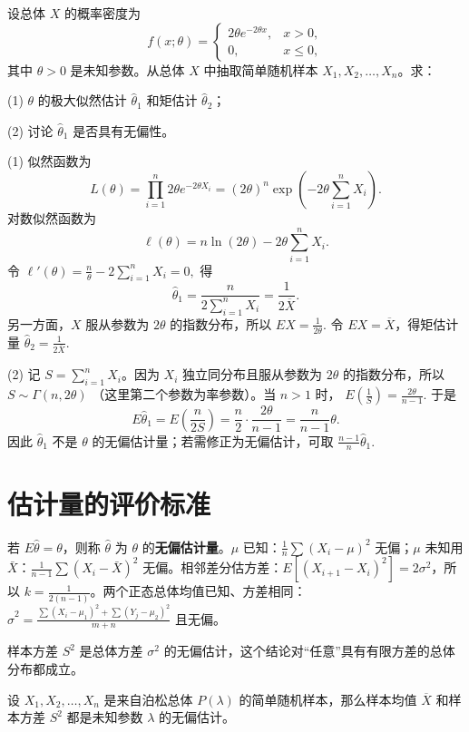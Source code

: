\documentclass[lang=cn,11pt]{elegantbook}
\begin{document}
\begin{exercise}\label{exer:src-2011-ab-b-08-34credit}
设总体 \(X\) 的概率密度为
\[
f(x;\theta)=
\begin{cases}
2\theta e^{-2\theta x}, & x>0,\\
0, & x\le0,
\end{cases}
\]
其中 \(\theta>0\) 是未知参数。从总体 \(X\) 中抽取简单随机样本
\(X_1,X_2,\dots,X_n\)。求：\par
(1) \(\theta\) 的极大似然估计 \(\hat\theta_1\) 和矩估计 \(\hat\theta_2\)；\par
(2) 讨论 \(\hat\theta_1\) 是否具有无偏性。
\end{exercise}
\begin{solution}
(1) 似然函数为
\[
L(\theta)=\prod_{i=1}^n 2\theta e^{-2\theta X_i}
=(2\theta)^n\exp\left(-2\theta\sum_{i=1}^n X_i\right).
\]
对数似然函数为
\[
\ell(\theta)=n\ln(2\theta)-2\theta\sum_{i=1}^n X_i.
\]
令
\(
\ell'(\theta)=\frac{n}{\theta}-2\sum_{i=1}^n X_i=0,
\)
得
\[
\hat\theta_1=\frac{n}{2\sum_{i=1}^n X_i}
=\frac1{2\overline X}.
\]
另一方面，\(X\) 服从参数为 \(2\theta\) 的指数分布，所以
\(
EX=\frac1{2\theta}.
\)
令 \(EX=\overline X\)，得矩估计量
\(
\hat\theta_2=\frac1{2\overline X}.
\)

(2) 记 \(S=\sum_{i=1}^n X_i\)。因为 \(X_i\) 独立同分布且服从参数为 \(2\theta\) 的指数分布，所以
\(
S\sim \Gamma(n,2\theta)
\)
（这里第二个参数为率参数）。当 \(n>1\) 时，
\(
E\left(\frac1S\right)=\frac{2\theta}{n-1}.
\)
于是
\[
E\hat\theta_1
=E\left(\frac{n}{2S}\right)
=\frac n2\cdot\frac{2\theta}{n-1}
=\frac{n}{n-1}\theta.
\]
因此 \(\hat\theta_1\) 不是 \(\theta\) 的无偏估计量；若需修正为无偏估计，可取
\(
\frac{n-1}{n}\hat\theta_1.
\)
\end{solution}


\section{估计量的评价标准} \label{subsec:criteria}

\begin{definition}[无偏性] \label{def:unbiased}
若 \(E\hat{\theta} = \theta\)，则称 \(\hat{\theta}\) 为 \(\theta\) 的\textbf{无偏估计量}。\(\mu\) 已知：\(\frac1n\sum(X_i-\mu)^2\) 无偏；\(\mu\) 未知用 \(\bar X\)：\(\frac1{n-1}\sum(X_i-\bar X)^2\) 无偏。相邻差分估方差：\(E[(X_{i+1}-X_i)^2]=2\sigma^2\)，所以 \(k=\frac1{2(n-1)}\)。两个正态总体均值已知、方差相同：\(\hat\sigma^2=\frac{\sum(X_i-\mu_1)^2+\sum(Y_j-\mu_2)^2}{m+n}\) 且无偏。
\end{definition}
\begin{proposition}[样本方差的无偏性]\label{prop:sample-variance-unbiased}
    样本方差 $S^2$ 是总体方差 $\sigma^2$ 的无偏估计，这个结论对“任意”具有有限方差的总体分布都成立。
\end{proposition}
\begin{proposition}[泊松分布无偏估计的不唯一性]\label{prop:poisson-unbiased}
    设 $X_1, X_2, \dots, X_n$ 是来自泊松总体 $P(\lambda)$ 的简单随机样本，那么样本均值 $\overline{X}$ 和样本方差 $S^2$ 都是未知参数 $\lambda$ 的无偏估计。
\end{proposition}
\end{document}
